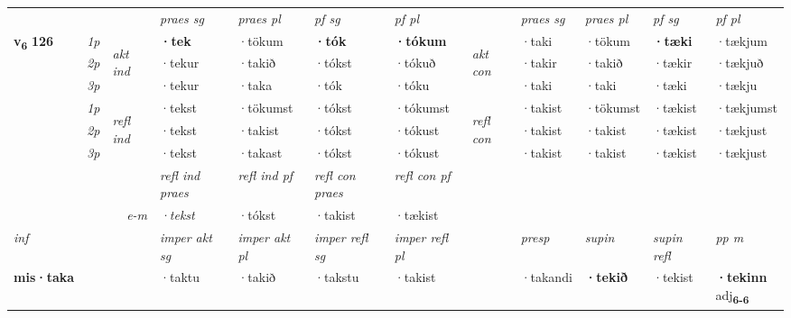 \begin{longtable}[l]{X>{\footnotesize\itshape}llXXXXlXXXX}
\midrule

 & &   & \textit{praes sg}  & \textit{praes pl}    & \textit{ pf sg} & \textit{pf pl} & & \textit{praes sg}  & \textit{praes pl}    & \textit{pf sg} & \textit{pf pl }  \\ \cmidrule{4-7} \cmidrule{9-12}
 \multirow{2}{*}{{{\textbf{v{\textsubscript{6}}} \Large{\textbf{126}}}}}  & 1p & \multirow{3}{*}{\begin{turn}{90}\textit{akt ind}\end{turn}} & \textbf{·tek} & ·tökum & \textbf{·tók} & \textbf{·tókum} & \multirow{3}{*}{\begin{turn}{90}\textit{akt con}\end{turn}} &·taki & ·tökum & \textbf{·tæki} & ·tækjum\\*
 & 2p &  &  ·tekur  & ·takið & ·tókst & ·tókuð & & ·takir & ·takið & ·tækir & ·tækjuð \\*
 & 3p &  & ·tekur & ·taka & ·tók & ·tóku & & ·taki & ·taki& ·tæki & ·tækju \\*
\cmidrule{4-7} \cmidrule{9-12}
 & 1p & \multirow{3}{*}{\begin{turn}{90}\textit{refl ind}\end{turn}}  & ·tekst & ·tökumst & ·tókst & ·tókumst & \multirow{3}{*}{\begin{turn}{90}\textit{refl con}\end{turn}}  &·takist & ·tökumst & ·tækist & ·tækjumst \\*
 & 2p &  & ·tekst & ·takist & ·tókst & ·tókust & &·takist & ·takist & ·tækist & ·tækjust \\*
 & 3p  & & ·tekst & ·takast & ·tókst & ·tókust & & ·takist & ·takist& ·tækist & ·tækjust \\*
\cmidrule{4-7} \cmidrule{9-12}

 & && \textit{refl ind praes} & \textit{refl ind pf} & \textit{refl con praes} & \textit{refl con pf} \\*
\multicolumn{3}{r}{\textit{e-m}}& ·tekst & ·tókst & ·takist & ·tækist \\*

\cmidrule{4-7}
   {\textit{inf}} & &  & \textit{imper akt sg} & \textit{imper akt pl} & \textit{imper refl sg} & \textit{imper refl pl} && \textit{presp} & \textit{supin} & \textit{supin refl} & \textit{pp m} \\*
  {\textbf{mis\allowbreak ·taka}} & && ·taktu  & ·takið & ·takstu & ·takist && ·takandi &  \textbf{·tekið} & ·tekist & \specialcell{\textbf{·tekinn} \\ adj\textbf{\textsubscript{6-6}}} \\*


\end{longtable}
